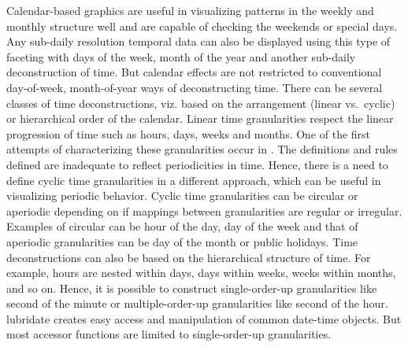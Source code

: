 \documentclass[12pt]{article}
\begin{document}
Calendar-based graphics\citep{wang2018calendar} are useful in
visualizing patterns in the weekly and monthly structure well and are
capable of checking the weekends or special days. Any sub-daily
resolution temporal data can also be displayed using this type of
faceting \citep{Wickham2009-pk} with days of the week, month of the year
and another sub-daily deconstruction of time. But calendar effects are
not restricted to conventional day-of-week, month-of-year ways of
deconstructing time. There can be several classes of time
deconstructions, viz. based on the arrangement (linear vs.~cyclic) or
hierarchical order of the calendar. Linear time granularities respect
the linear progression of time such as hours, days, weeks and months.
One of the first attempts of characterizing these granularities occur in
\citep{Bettini1998-ed}. The definitions and rules defined are inadequate
to reflect periodicities in time. Hence, there is a need to define
cyclic time granularities in a different approach, which can be useful
in visualizing periodic behavior. Cyclic time granularities can be
circular or aperiodic depending on if mappings between granularities are
regular or irregular. Examples of circular can be hour of the day, day
of the week and that of aperiodic granularities can be day of the month
or public holidays. Time deconstructions can also be based on the
hierarchical structure of time. For example, hours are nested within
days, days within weeks, weeks within months, and so on. Hence, it is
possible to construct single-order-up granularities like second of the
minute or multiple-order-up granularities like second of the hour.
lubridate \citep{G_Grolemund2011-vm} creates easy access and
manipulation of common date-time objects. But most accessor functions
are limited to single-order-up granularities.
\end{document}
